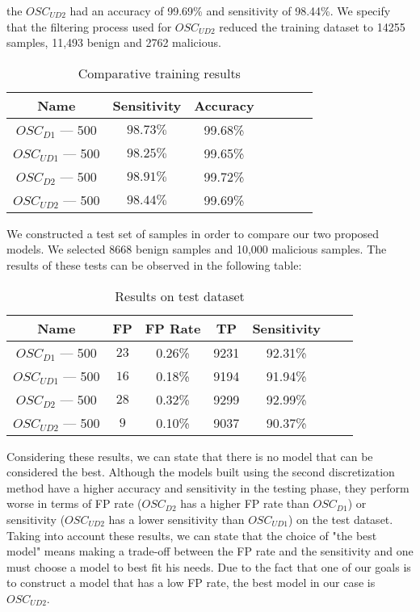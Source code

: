 the {$OSC_{UD2}$} had an accuracy of 99.69\% and sensitivity of 98.44\%. We specify that the filtering process used for {$OSC_{UD2}$} reduced the training dataset to 14255 samples, 11,493 benign and 2762 malicious.
\begin{table}[ht]
    \centering
    \begin{tabular}{| c | c | c | c | c | c | c | }
    \hline
    Name & Sensitivity & Accuracy\\ \hline
    \textit{$OSC_{D1}$} --- 500 & $98.73\%$ &  99.68\% \\ \hline
    \textit{$OSC_{UD1}$} --- 500 & $98.25\%$ &  99.65\% \\ \hline
    \textit{$OSC_{D2}$} --- 500  & $98.91\%$ &  99.72\% \\ \hline
    \textit{$OSC_{UD2}$} --- 500 & $98.44\%$ &  99.69\% \\ \hline
    \end{tabular}
    \caption{Comparative training results} 
    \label{tab:trainingresults}
\end{table}
\par
We constructed a test set of samples in order to compare our two proposed models. We selected 8668 benign samples and 10,000 malicious samples. The results of these tests can be observed in the following table:
\begin{table}[ht]
    \centering
    \begin{tabular}{| c | c | c | c | c | c | c | }
    \hline
    Name & FP & FP Rate & TP & Sensitivity\\ \hline
    \textit{$OSC_{D1}$} --- 500 & $23$ & 0.26\% & 9231 & 92.31\% \\ \hline
    \textit{$OSC_{UD1}$} --- 500 & $16$ &  0.18\% & 9194 & 91.94\% \\ \hline
    \textit{$OSC_{D2}$} --- 500 & $28$ & 0.32\% & 9299 & 92.99\% \\ \hline
    \textit{$OSC_{UD2}$} --- 500 & $9$ &  0.10\% & 9037 & 90.37\% \\ \hline
    \end{tabular}
    \caption{Results on test dataset} 
    \label{tab:testresults}
\end{table}
\par
Considering these results, we can state that there is no model that can be considered the best.  Although the models built using the second discretization method have a higher accuracy and sensitivity in the testing phase, they perform worse in terms of FP rate ({$OSC_{D2}$} has a higher FP rate than {$OSC_{D1}$}) or sensitivity ({$OSC_{UD2}$} has a lower sensitivity than {$OSC_{UD1}$}) on the test dataset. Taking into account these results, we can state that the choice of "the best model" means making a trade-off between the FP rate and the sensitivity and one must choose a model to best fit his needs. Due to the fact that one of our goals is to construct a model that has a low FP rate, the best model in our case is {$OSC_{UD2}$}.